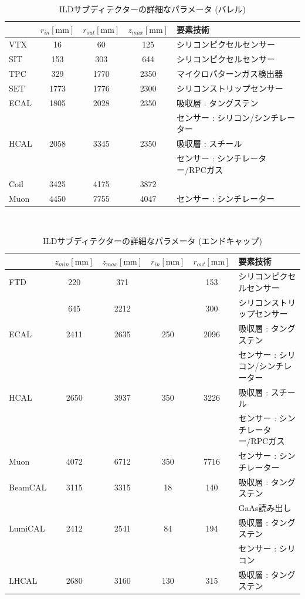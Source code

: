 \begin{table}[htb]
 \centering
  \small
  \begin{tabular}{l c c c l} \hline
     & $r_{in} \mathrm{[mm]}$ & $r_{out} \mathrm{[mm]}$ & $z_{max} \mathrm{[mm]}$ & 要素技術\\ \hline \hline
    VTX & 16 & 60 & 125 & シリコンピクセルセンサー\\
    SIT & 153 & 303 & 644 & シリコンピクセルセンサー\\
    TPC & 329 & 1770 & 2350 & マイクロパターンガス検出器\\
    SET & 1773 & 1776 & 2300 & シリコンストリップセンサー\\ \hline
    ECAL & 1805 & 2028 & 2350 & 吸収層 : タングステン\\
    &&&& センサー : シリコン/シンチレーター\\
    HCAL & 2058 & 3345 & 2350 & 吸収層 : スチール\\
    &&&& センサー : シンチレーター/RPCガス\\ \hline
    Coil & 3425 & 4175 & 3872\\
    Muon & 4450 & 7755 & 4047 & センサー : シンチレーター\\ \hline
  \end{tabular}
  \caption{ILDサブディテクターの詳細なパラメータ (バレル) \cite{InterimDesignReport}}
  \label{ILDSubdetectorParametersBarrel}
\end{table}

\begin{table}[htb]
 \centering
　\small
  \begin{tabular}{l c c c c l} \hline
     & $z_{min} \mathrm{[mm]}$ & $z_{max} \mathrm{[mm]}$ & $r_{in} \mathrm{[mm]}$ & $r_{out} \mathrm{[mm]}$ & 要素技術\\ \hline \hline
    FTD & 220 & 371 & & 153 & シリコンピクセルセンサー\\
            & 645 & 2212 & & 300 & シリコンストリップセンサー\\ \hline
    ECAL & 2411 & 2635 & 250 & 2096 & 吸収層 : タングステン\\
    &&&&& センサー : シリコン/シンチレーター\\
    HCAL & 2650 & 3937 & 350 & 3226 & 吸収層 : スチール\\
    &&&&& センサー : シンチレーター/RPCガス\\
    Muon & 4072 & 6712 & 350 & 7716 & センサー : シンチレーター\\ \hline
    BeamCAL & 3115 & 3315 & 18 & 140 & 吸収層 : タングステン\\
    &&&&& GaAs読み出し \\
    LumiCAL & 2412 & 2541 & 84 & 194 & 吸収層 : タングステン\\
    &&&&& センサー : シリコン\\
    LHCAL & 2680 & 3160 & 130 & 315 &吸収層 : タングステン\\ \hline
  \end{tabular}
  \caption{ILDサブディテクターの詳細なパラメータ (エンドキャップ) \cite{InterimDesignReport}}
  \label{ILDSubdetectorParametersEndCap}
\end{table}

